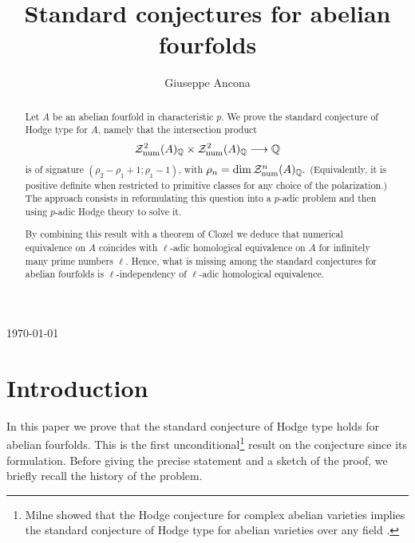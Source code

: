 \documentclass[11pt]{amsart}
\begin{document}
\newcommand{\ul}[1]{\underline{#1}}
\newcommand{\tn}[1]{\textnormal{#1}}
\newcommand{\tbf}[1]{\textbf{#1}}

\newcommand{\Spt}{\mathop{\mathbf{Spt}}\nolimits}
\newcommand{\ra}{\rightarrow}
\newcommand{\old}{\mathrm{old}}



\setcounter{tocdepth}{1}

\title[Standard conjectures for abelian fourfolds]{Standard conjectures for abelian fourfolds}

\author{Giuseppe Ancona}
\address{Institut de Recherche Math\'ematique Avanc\'ee, Universit\'e de Strasbourg}


\begin{abstract}
Let $A$ be an abelian fourfold in characteristic $p$. We prove the standard conjecture of Hodge type for $A$, namely that the intersection product
\[\mathcal{Z}^2_{\mathrm{num}}(A)_{\mathbb{Q}}\times \mathcal{Z}_{\mathrm{num}}^2(A)_{\mathbb{Q}} \longrightarrow \mathbb{Q}\]
is of signature $(\rho_2 - \rho_1 +1; \rho_1 - 1)$, with
$\rho_n=\dim \mathcal{Z}_{\mathrm{num}}^n(A)_{\mathbb{Q}}.$  (Equivalently, it is positive definite when restricted to primitive classes for any choice of the polarization.) The approach consists in reformulating   this question into a $p$-adic problem and then using $p$-adic Hodge theory to solve it.

By combining this result with a theorem of Clozel we deduce that numerical equivalence on $A$ coincides with $\ell$-adic homological equivalence on $A$ for infinitely many prime numbers $\ell$. Hence, what is missing among the standard conjectures for abelian fourfolds  is $\ell$-independency of $\ell$-adic homological equivalence.
\end{abstract}

\maketitle
\begin{center}
\today
\end{center}
\tableofcontents
\section{Introduction}
In this paper we prove that the standard conjecture of Hodge type holds for abelian fourfolds. This is the first  unconditional\footnote{Milne showed that the   Hodge conjecture for complex abelian varieties  implies the standard conjecture of Hodge type for abelian varieties over any field \cite{pola}.}  result on the conjecture since its formulation. Before giving the precise statement and a sketch of the proof, we briefly recall the history of the problem. 
\end{document}
